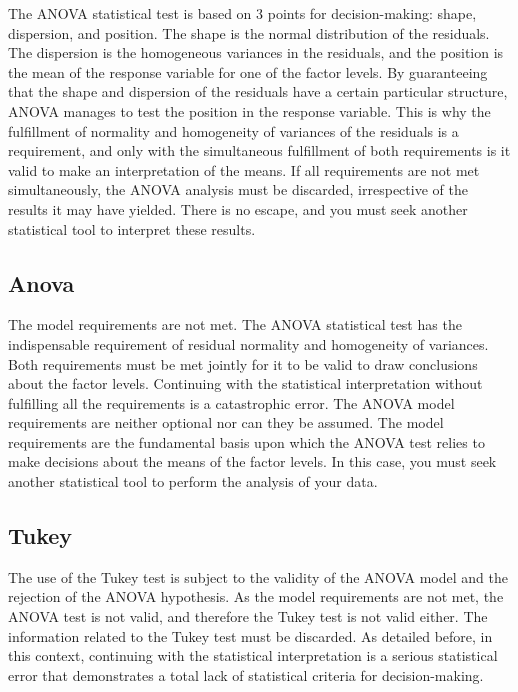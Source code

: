 \documentclass[
  letterpaper,
  DIV=11,
  numbers=noendperiod]{scrartcl}
\begin{document}
The ANOVA statistical test is based on 3 points for decision-making:
shape, dispersion, and position. The shape is the normal distribution of
the residuals. The dispersion is the homogeneous variances in the
residuals, and the position is the mean of the response variable for one
of the factor levels. By guaranteeing that the shape and dispersion of
the residuals have a certain particular structure, ANOVA manages to test
the position in the response variable. This is why the fulfillment of
normality and homogeneity of variances of the residuals is a
requirement, and only with the simultaneous fulfillment of both
requirements is it valid to make an interpretation of the means. If all
requirements are not met simultaneously, the ANOVA analysis must be
discarded, irrespective of the results it may have yielded. There is no
escape, and you must seek another statistical tool to interpret these
results.

\subsection{Anova}\label{anova}

The model requirements are not met. The ANOVA statistical test has the
indispensable requirement of residual normality and homogeneity of
variances. Both requirements must be met jointly for it to be valid to
draw conclusions about the factor levels. Continuing with the
statistical interpretation without fulfilling all the requirements is a
catastrophic error. The ANOVA model requirements are neither optional
nor can they be assumed. The model requirements are the fundamental
basis upon which the ANOVA test relies to make decisions about the means
of the factor levels. In this case, you must seek another statistical
tool to perform the analysis of your data.

\subsection{Tukey}\label{tukey}

The use of the Tukey test is subject to the validity of the ANOVA model
and the rejection of the ANOVA hypothesis. As the model requirements are
not met, the ANOVA test is not valid, and therefore the Tukey test is
not valid either. The information related to the Tukey test must be
discarded. As detailed before, in this context, continuing with the
statistical interpretation is a serious statistical error that
demonstrates a total lack of statistical criteria for decision-making.
\end{document}
